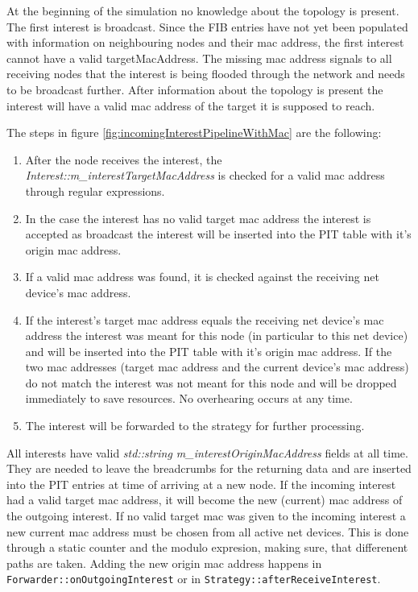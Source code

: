 At the beginning of the simulation no knowledge about the topology is present. The first interest is broadcast. Since the FIB entries have not yet been populated with information on neighbouring nodes and their mac address, the first interest cannot have a valid targetMacAddress. The missing mac address signals to all receiving nodes that the interest is being flooded through the network and needs to be broadcast further. After information about the topology is present the interest will have a valid mac address of the target it is supposed to reach.

The steps in figure \ref{fig:incomingInterestPipelineWithMac} are the following:

\begin{enumerate}
\item After the node receives the interest, the \emph{Interest::m\_interestTargetMacAddress} is checked for a valid mac address through regular expressions.
\item In the case the interest has no valid target mac address the interest is accepted as broadcast the interest will be inserted into the PIT table with it's origin mac address.
\item If a valid mac address was found, it is checked against the receiving net device's mac address.
\item If the interest's target mac address equals the receiving net device's mac address the interest was meant for this node (in particular to this net device) and will be inserted into the PIT table with it's origin mac address. If the two mac addresses (target mac address and the current device's mac address) do not match the interest was not meant for this node and will be dropped immediately to save resources. No overhearing occurs at any time.
\item The interest will be forwarded to the strategy for further processing.
\end{enumerate}

All interests have valid \emph{std::string m\_interestOriginMacAddress} fields at all time. They are needed to leave the breadcrumbs for the returning data and are inserted into the PIT entries at time of arriving at a new node. If the incoming interest had a valid target mac address, it will become the new (current) mac address of the outgoing interest. If no valid target mac was given to the incoming interest a new current mac address must be chosen from all active net devices. This is done through a static counter and the modulo expresion, making sure, that differenent paths are taken. Adding the new origin mac address happens in \texttt{Forwarder::onOutgoingInterest} or in \texttt{Strategy::afterReceiveInterest}.

